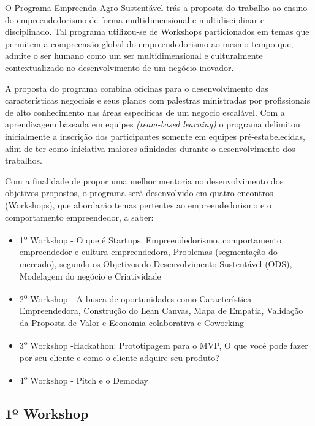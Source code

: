 O Programa Empreenda Agro Sustentável trás a proposta do trabalho ao ensino do empreendedorismo de forma multidimensional e  multidisciplinar e disciplinado. Tal programa utilizou-se de Workshops particionados em temas que permitem a compreensão global do empreendedorismo ao mesmo tempo que, admite o ser humano como um ser multidimensional e culturalmente contextualizado no desenvolvimento de um negócio inovador. 

A proposta do programa combina oficinas para o desenvolvimento das características negociais e seus planos com palestras ministradas por profissionais de alto conhecimento nas áreas específicas de um negocio escalável. Com a aprendizagem baseada em equipes \textit{(team-based learning)} o programa delimitou inicialmente a inscrição dos participantes somente em equipes pré-estabelecidas, afim de ter como iniciativa maiores afinidades durante o desenvolvimento dos trabalhos. 


Com a finalidade de propor uma melhor mentoria no desenvolvimento dos objetivos propostos, o programa será desenvolvido em quatro encontros (Workshops), que abordarão temas pertentes ao empreendedorismo e o comportamento empreendedor, a saber:

\begin{itemize}
\item{1\textsuperscript{o} Workshop - O que é Startups, Empreendedorismo, comportamento empreendedor e cultura empreendedora, Problemas (segmentação do mercado), segundo os Objetivos do Desenvolvimento Sustentável (ODS), Modelagem do negócio e Criatividade}

\item{2\textsuperscript{o} Workshop - A busca de oportunidades como Característica Empreendedora, Construção do Lean Canvas, Mapa de Empatia, Validação da Proposta de Valor e Economia colaborativa e Coworking}
\item{3\textsuperscript{o} Workshop -Hackathon: Prototipagem para o MVP, O que você pode fazer por seu cliente e como o cliente adquire seu produto?}

\item{4\textsuperscript{o} Workshop - Pitch e o Demoday}

\end{itemize}


\subsection{1º Workshop}

